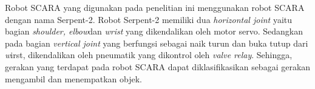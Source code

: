   Robot SCARA yang digunakan pada penelitian ini menggunakan robot SCARA dengan nama Serpent-2. Robot Serpent-2 memiliki dua \textit{horizontal joint} yaitu bagian \textit{shoulder, elbow}dan \textit{wrist} yang dikendalikan oleh motor servo. Sedangkan pada bagian \textit{vertical joint} yang berfungsi sebagai naik turun dan buka tutup dari \emph wirst, dikendalikan oleh pneumatik yang dikontrol oleh \emph {valve relay}. Sehingga, gerakan yang terdapat pada robot SCARA dapat diklasifikasikan sebagai gerakan mengambil dan menempatkan objek. 
  \begin{table}[H]
  	\centering
  	\caption{Spesifikasi Robot Serpent-2}
  \end{table}


